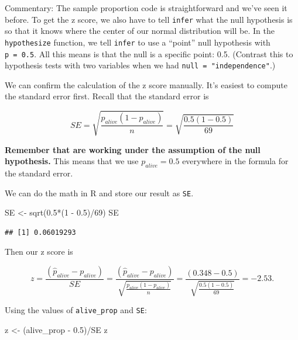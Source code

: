 \documentclass[
]{book}
\newenvironment{Shaded}{\begin{snugshade}}{\end{snugshade}}
\newcommand{\DecValTok}[1]{\textcolor[rgb]{0.00,0.00,0.81}{#1}}
\newcommand{\FloatTok}[1]{\textcolor[rgb]{0.00,0.00,0.81}{#1}}
\newcommand{\FunctionTok}[1]{\textcolor[rgb]{0.00,0.00,0.00}{#1}}
\newcommand{\NormalTok}[1]{#1}
\newcommand{\OtherTok}[1]{\textcolor[rgb]{0.56,0.35,0.01}{#1}}
\newcommand{\SpecialCharTok}[1]{\textcolor[rgb]{0.00,0.00,0.00}{#1}}
\begin{document}
Commentary: The sample proportion code is straightforward and we've seen it before. To get the z score, we also have to tell \texttt{infer} what the null hypothesis is so that it knows where the center of our normal distribution will be. In the \texttt{hypothesize} function, we tell \texttt{infer} to use a ``point'' null hypothesis with \texttt{p\ =\ 0.5}. All this means is that the null is a specific point: 0.5. (Contrast this to hypothesis tests with two variables when we had \texttt{null\ =\ "independence"}.)

We can confirm the calculation of the z score manually. It's easiest to compute the standard error first. Recall that the standard error is

\[
SE = \sqrt{\frac{p_{alive}(1 - p_{alive})}{n}} = \sqrt{\frac{0.5(1 - 0.5)}{69}}
\]

\textbf{Remember that are working under the assumption of the null hypothesis.} This means that we use \(p_{alive} = 0.5\) everywhere in the formula for the standard error.

We can do the math in R and store our result as \texttt{SE}.

\begin{Shaded}
\begin{Highlighting}[]
\NormalTok{SE }\OtherTok{\textless{}{-}} \FunctionTok{sqrt}\NormalTok{(}\FloatTok{0.5}\SpecialCharTok{*}\NormalTok{(}\DecValTok{1} \SpecialCharTok{{-}} \FloatTok{0.5}\NormalTok{)}\SpecialCharTok{/}\DecValTok{69}\NormalTok{)}
\NormalTok{SE}
\end{Highlighting}
\end{Shaded}

\begin{verbatim}
## [1] 0.06019293
\end{verbatim}

Then our z score is

\[
z = \frac{(\hat{p}_{alive} - p_{alive})}{SE} =  \frac{(\hat{p}_{alive} - p_{alive})}{\sqrt{\frac{p_{alive} (1 - p_{alive})}{n}}} = \frac{(0.348 - 0.5)}{\sqrt{\frac{0.5 (1 - 0.5)}{69}}} =  -2.53.
\]

Using the values of \texttt{alive\_prop} and \texttt{SE}:

\begin{Shaded}
\begin{Highlighting}[]
\NormalTok{z }\OtherTok{\textless{}{-}}\NormalTok{ (alive\_prop }\SpecialCharTok{{-}} \FloatTok{0.5}\NormalTok{)}\SpecialCharTok{/}\NormalTok{SE}
\NormalTok{z}
\end{Highlighting}
\end{Shaded}
\end{document}
